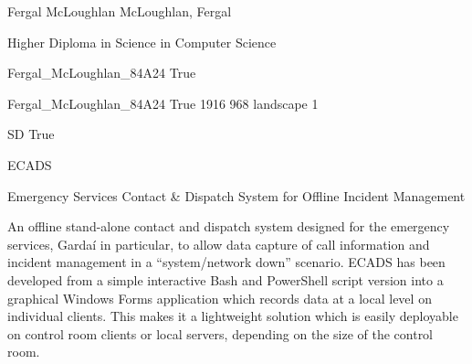 \documentclass[twoside]{report}
\begin{document}
\begingroup{}\relax



\def\Key{Fergal_McLoughlan_84A24}

{Fergal McLoughlan}
{McLoughlan, Fergal}

{Higher Diploma in Science in Computer Science}

{Fergal_McLoughlan_84A24}
{True}

{Fergal_McLoughlan_84A24}
{True}
{1916}
{968}
{landscape}
{1}

{SD}
{True}

{ECADS}

{Emergency Services Contact \& Dispatch System for Offline Incident Management}

{An offline stand-alone contact and dispatch system designed for the emergency services, Gardaí in particular, to allow data capture of call information and incident management in a \textquotedblleft{}system/network down\textquotedblright{} scenario.
ECADS has been developed from a simple interactive Bash and PowerShell script version into a graphical Windows Forms application which records data at a local level on individual clients. This makes it a lightweight solution which is easily deployable on control room clients or local servers, depending on the size of the control room.}
\end{document}
